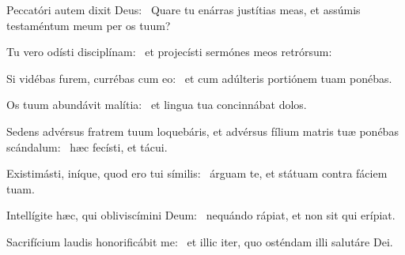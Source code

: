 \item Peccatóri autem dixit Deus:~\psstar{} Quare tu enárras justítias meas, et assúmis testaméntum meum per os tuum?

\item Tu vero odísti disciplínam:~\psstar{} et projecísti sermónes meos retrórsum:

\item Si vidébas furem, currébas cum eo:~\psstar{} et cum adúlteris portiónem tuam ponébas.

\item Os tuum abundávit malítia:~\psstar{} et lingua tua concinnábat dolos.

\item Sedens advérsus fratrem tuum loquebáris, et advérsus fílium matris tuæ ponébas scándalum:~\psstar{} hæc fecísti, et tácui.

\item Existimásti, iníque, quod ero tui símilis:~\psstar{} árguam te, et státuam contra fáciem tuam.

\item Intellígite hæc, qui obliviscímini Deum:~\psstar{} nequándo rápiat, et non sit qui erípiat.

\item Sacrifícium laudis honorificábit me:~\psstar{} et illic iter, quo osténdam illi salutáre Dei.